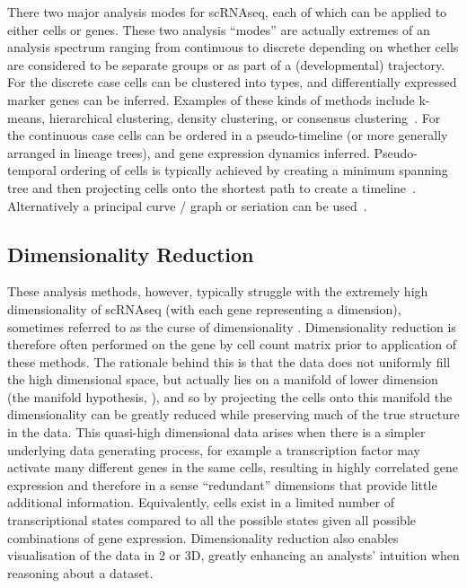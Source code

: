 There two major analysis modes for scRNAseq, each of which can be applied to either cells or genes. These two analysis ``modes'' are actually extremes of an analysis spectrum ranging from continuous to discrete depending on whether cells are considered to be separate groups or as part of a (developmental) trajectory. For the discrete case cells can be clustered into types, and differentially expressed marker genes can be inferred. Examples of these kinds of methods include k-means, hierarchical clustering, density clustering, or consensus clustering~\parencite{Zurauskiene2016pcaReduce,Kiselev2017SC3,Guo2015SINCERA,Satija2015Spatial}. For the continuous case cells can be ordered in a pseudo-timeline (or more generally arranged in lineage trees), and gene expression dynamics inferred. Pseudo-temporal ordering of cells is typically achieved by creating a minimum spanning tree and then projecting cells onto the shortest path to create a timeline~\parencite{Trapnell2014dynamics,Ji2016TSCAN}. Alternatively a principal curve / graph or seriation can be used~\parencite{Marco2014Bifurcation,Qiu2017Reversed}.

\subsection{Dimensionality Reduction}

These analysis methods, however, typically struggle with the extremely high dimensionality of scRNAseq (with each gene representing a dimension), sometimes referred to as the curse of dimensionality \parencite{Donoho2000HighDimensional}. Dimensionality reduction is therefore often performed on the gene by cell count matrix prior to application of these methods. The rationale behind this is that the data does not uniformly fill the high dimensional space, but actually lies on a manifold of lower dimension (the manifold hypothesis, \cite{Moon2018Manifold}), and so by projecting the cells onto this manifold the dimensionality can be greatly reduced while preserving much of the true structure in the data. This quasi-high dimensional data arises when there is a simpler underlying data generating process, for example a transcription factor may activate many different genes in the same cells, resulting in highly correlated gene expression and therefore in a sense ``redundant'' dimensions that provide little additional information. Equivalently, cells exist in a limited number of transcriptional states compared to all the possible states given all possible combinations of gene expression. Dimensionality reduction also enables visualisation of the data in 2 or 3D, greatly enhancing an analysts' intuition when reasoning about a dataset.

